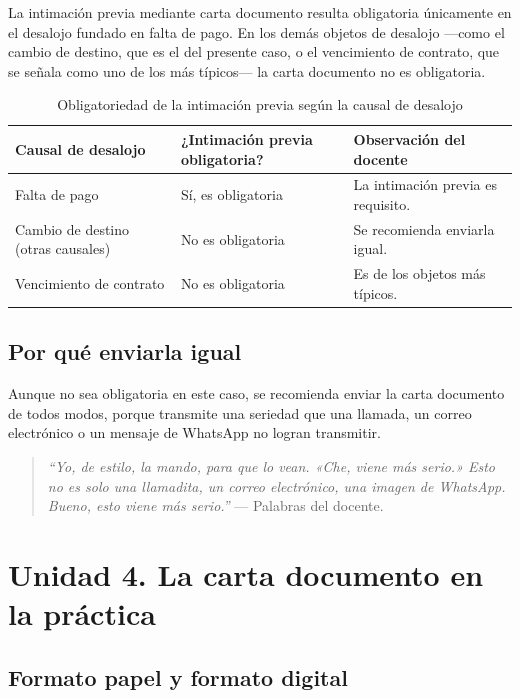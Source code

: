 \documentclass[12pt,oneside]{book}
\begin{document}
La intimación previa mediante carta documento resulta obligatoria únicamente en el desalojo fundado en falta de pago. En los demás objetos de desalojo —como el cambio de destino, que es el del presente caso, o el vencimiento de contrato, que se señala como uno de los más típicos— la carta documento no es obligatoria.

\begin{table}[H]
\centering
\caption{Obligatoriedad de la intimación previa según la causal de desalojo}
\begin{tabular}{@{}lll@{}}
\toprule
\textbf{Causal de desalojo} & \textbf{¿Intimación previa obligatoria?} & \textbf{Observación del docente} \\
\midrule
Falta de pago & Sí, es obligatoria & La intimación previa es requisito. \\
Cambio de destino (otras causales) & No es obligatoria & Se recomienda enviarla igual. \\
Vencimiento de contrato & No es obligatoria & Es de los objetos más típicos. \\
\bottomrule
\end{tabular}
\end{table}

\subsection*{Por qué enviarla igual}

Aunque no sea obligatoria en este caso, se recomienda enviar la carta documento de todos modos, porque transmite una seriedad que una llamada, un correo electrónico o un mensaje de WhatsApp no logran transmitir.

\begin{quote}
\textit{``Yo, de estilo, la mando, para que lo vean. «Che, viene más serio.» Esto no es solo una llamadita, un correo electrónico, una imagen de WhatsApp. Bueno, esto viene más serio.''} --- Palabras del docente.
\end{quote}

\section*{Unidad 4. La carta documento en la práctica}

\subsection*{Formato papel y formato digital}
\end{document}
